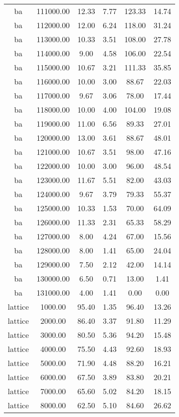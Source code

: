 \begin{table}[ht]
\begin{table}[ht]
\begin{tabular}{|cccccc}
  ba & 111000.00 & 12.33 & 7.77 & 123.33 & 14.74 \\ 
  ba & 112000.00 & 12.00 & 6.24 & 118.00 & 31.24 \\ 
  ba & 113000.00 & 10.33 & 3.51 & 108.00 & 27.78 \\ 
  ba & 114000.00 & 9.00 & 4.58 & 106.00 & 22.54 \\ 
  ba & 115000.00 & 10.67 & 3.21 & 111.33 & 35.85 \\ 
  ba & 116000.00 & 10.00 & 3.00 & 88.67 & 22.03 \\ 
  ba & 117000.00 & 9.67 & 3.06 & 78.00 & 17.44 \\ 
  ba & 118000.00 & 10.00 & 4.00 & 104.00 & 19.08 \\ 
  ba & 119000.00 & 11.00 & 6.56 & 89.33 & 27.01 \\ 
  ba & 120000.00 & 13.00 & 3.61 & 88.67 & 48.01 \\ 
  ba & 121000.00 & 10.67 & 3.51 & 98.00 & 47.16 \\ 
  ba & 122000.00 & 10.00 & 3.00 & 96.00 & 48.54 \\ 
  ba & 123000.00 & 11.67 & 5.51 & 82.00 & 43.03 \\ 
  ba & 124000.00 & 9.67 & 3.79 & 79.33 & 55.37 \\ 
  ba & 125000.00 & 10.33 & 1.53 & 70.00 & 64.09 \\ 
  ba & 126000.00 & 11.33 & 2.31 & 65.33 & 58.29 \\ 
  ba & 127000.00 & 8.00 & 4.24 & 67.00 & 15.56 \\ 
  ba & 128000.00 & 8.00 & 1.41 & 65.00 & 24.04 \\ 
  ba & 129000.00 & 7.50 & 2.12 & 42.00 & 14.14 \\ 
  ba & 130000.00 & 6.50 & 0.71 & 13.00 & 1.41 \\ 
  ba & 131000.00 & 4.00 & 1.41 & 0.00 & 0.00 \\ 
  lattice & 1000.00 & 95.40 & 1.35 & 96.40 & 13.26 \\ 
  lattice & 2000.00 & 86.40 & 3.37 & 91.80 & 11.29 \\ 
  lattice & 3000.00 & 80.50 & 5.36 & 94.20 & 15.48 \\ 
  lattice & 4000.00 & 75.50 & 4.43 & 92.60 & 18.93 \\ 
  lattice & 5000.00 & 71.90 & 4.48 & 88.20 & 16.21 \\ 
  lattice & 6000.00 & 67.50 & 3.89 & 83.80 & 20.21 \\ 
  lattice & 7000.00 & 65.60 & 5.02 & 84.20 & 18.15 \\ 
  lattice & 8000.00 & 62.50 & 5.10 & 84.60 & 26.62 \\ 

\end{tabular}
\end{table}
\end{table}
